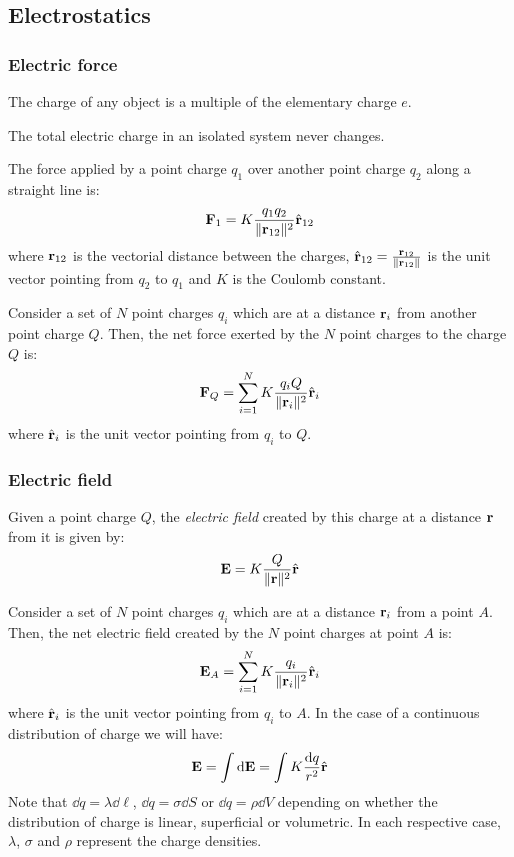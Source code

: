 \documentclass[../../../main.tex]{subfiles}
\begin{document}
\begin{multicols}{2}
    \subsection{Electrostatics}
    \subsubsection{Electric force}
    \begin{prop}
        The charge of any object is a multiple of the elementary charge $e$.
    \end{prop}
    \begin{law}
        The total electric charge in an isolated system never changes.
    \end{law}
    \begin{law}
        The force applied by a point charge $q_1$ over another point charge $q_2$ along a straight line is:
        $$\boldsymbol{\mathrm{F}}_1=K\frac{q_1q_2}{\|\boldsymbol{\mathrm{r}}_{12}\|^2}\hat{\boldsymbol{\mathrm{r}}}_{12}$$
        where $\boldsymbol{\mathrm{r}}_{12}$ is the vectorial distance between the charges, $\hat{\boldsymbol{\mathrm{r}}}_{12}=\frac{\boldsymbol{\mathrm{r}}_{12}}{\|\boldsymbol{\mathrm{r}}_{12}\|}$ is the unit vector pointing from $q_2$ to $q_1$ and $K$ is the Coulomb constant.
    \end{law}
    \begin{principle}
        Consider a set of $N$ point charges $q_i$ which are at a distance $\boldsymbol{\mathrm{r}}_i$ from another point charge $Q$. Then, the net force exerted by the $N$ point charges to the charge $Q$ is:
        $$\boldsymbol{\mathrm{F}}_Q=\sum_{i=1}^NK\frac{q_iQ}{\|\boldsymbol{\mathrm{r}}_{i}\|^2}\hat{\boldsymbol{\mathrm{r}}}_{i}$$ where $\hat{\boldsymbol{\mathrm{r}}}_{i}$ is the unit vector pointing from $q_i$ to $Q$.
    \end{principle}
    \subsubsection{Electric field}
    \begin{definition}
        Given a point charge $Q$, the \textit{electric field} created by this charge at a distance $\boldsymbol{\mathrm{r}}$ from it is given by:
        $$\boldsymbol{\mathrm{E}}=K\frac{Q}{\|\boldsymbol{\mathrm{r}}\|^2}\hat{\boldsymbol{\mathrm{r}}}$$
    \end{definition}
    \begin{principle}
        Consider a set of $N$ point charges $q_i$ which are at a distance $\boldsymbol{\mathrm{r}}_i$ from a point $A$. Then, the net electric field created by the $N$ point charges at point $A$ is:
        $$\boldsymbol{\mathrm{E}}_A=\sum_{i=1}^NK\frac{q_i}{\|\boldsymbol{\mathrm{r}}_{i}\|^2}\hat{\boldsymbol{\mathrm{r}}}_{i}$$ where $\hat{\boldsymbol{\mathrm{r}}}_{i}$ is the unit vector pointing from $q_i$ to $A$. In the case of a continuous distribution of charge we will have:
        $$\boldsymbol{\mathrm{E}}=\int\dd\boldsymbol{\mathrm{E}}=\int K\frac{\dd q}{r^2}\hat{\boldsymbol{\mathrm{r}}}$$
        Note that $\dd q=\lambda\dd \ell$, $\dd q=\sigma\dd S$ or $\dd q=\rho\dd V$ depending on whether the distribution of charge is linear, superficial or volumetric. In each respective case, $\lambda$, $\sigma$ and $\rho$ represent the charge densities.
    \end{principle}

\end{multicols}
\end{document}
